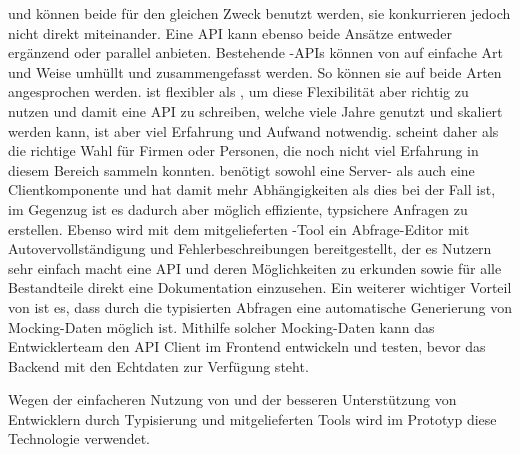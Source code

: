 und  können beide für den gleichen Zweck benutzt werden, sie konkurrieren jedoch nicht direkt miteinander. Eine API kann ebenso beide Ansätze entweder ergänzend oder parallel anbieten. Bestehende -APIs können von  auf einfache Art und Weise umhüllt und zusammengefasst werden. So können sie auf beide Arten angesprochen werden.  ist flexibler als , um diese Flexibilität aber richtig zu nutzen und damit eine API zu schreiben, welche viele Jahre genutzt und skaliert werden kann, ist aber viel Erfahrung und Aufwand notwendig.  scheint daher als die richtige Wahl für Firmen oder Personen, die noch nicht viel Erfahrung in diesem Bereich sammeln konnten.  benötigt sowohl eine Server- als auch eine Clientkomponente und hat damit mehr Abhängigkeiten als dies bei  der Fall ist, im Gegenzug ist es dadurch aber möglich effiziente, typsichere Anfragen zu erstellen. Ebenso wird mit dem mitgelieferten -Tool ein Abfrage-Editor mit Autovervollständigung und Fehlerbeschreibungen bereitgestellt, der es Nutzern sehr einfach macht eine API und deren Möglichkeiten zu erkunden sowie für alle Bestandteile direkt eine Dokumentation einzusehen. Ein weiterer wichtiger Vorteil von  ist es, dass durch die typisierten Abfragen eine automatische Generierung von Mocking-Daten möglich ist. Mithilfe solcher Mocking-Daten kann das Entwicklerteam den API Client im Frontend entwickeln und testen, bevor das Backend mit den Echtdaten zur Verfügung steht.

Wegen der einfacheren Nutzung von  und der besseren Unterstützung von Entwicklern durch Typisierung und mitgelieferten Tools wird im Prototyp diese Technologie verwendet.

